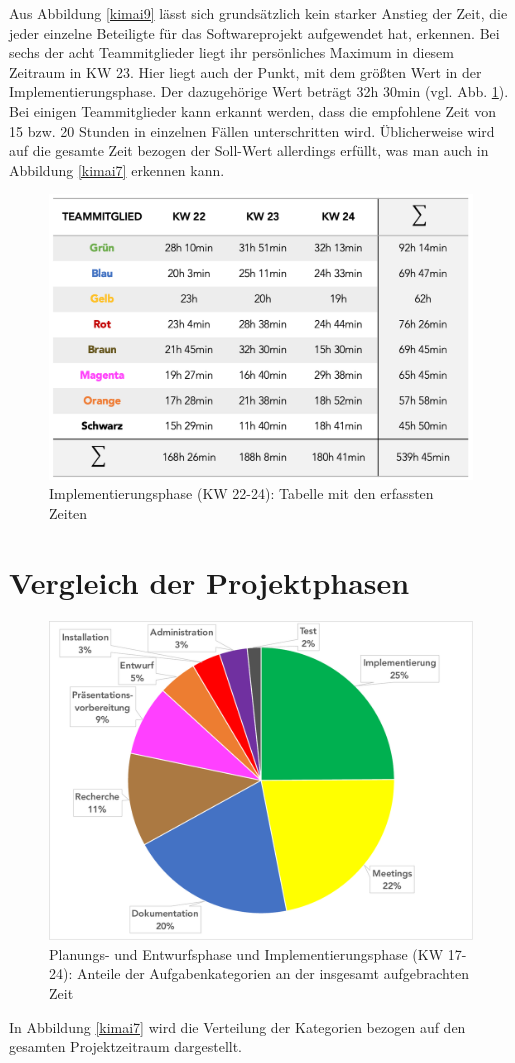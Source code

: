 \documentclass[../review_2.tex]{subfiles}
\begin{document}
Aus Abbildung \ref{kimai9} lässt sich grundsätzlich kein starker Anstieg der Zeit, die jeder einzelne Beteiligte für das Softwareprojekt aufgewendet hat, erkennen. Bei sechs der acht Teammitglieder liegt ihr persönliches Maximum in diesem Zeitraum in KW 23. Hier liegt auch der Punkt, mit dem größten Wert in der Implementierungsphase. Der dazugehörige Wert beträgt 32h 30min (vgl. Abb. \ref{kimai11}).
Bei einigen Teammitglieder kann erkannt werden, dass die empfohlene Zeit von 15 bzw. 20 Stunden in einzelnen Fällen unterschritten wird. Üblicherweise wird auf die gesamte Zeit bezogen der Soll-Wert allerdings erfüllt, was man auch in Abbildung \ref{kimai7} erkennen kann.


\begin{figure} [h]
    \centering
    \includegraphics[width = 0.8\linewidth]{img/kimai11.png}
    \caption{Implementierungsphase (KW 22-24): Tabelle mit den erfassten Zeiten}
    \label{kimai11}
\end{figure} 

\section{Vergleich der Projektphasen}
\begin{figure} [h]
    \centering
    \includegraphics[width = 0.8\linewidth]{img/kimai6.pdf}
    \caption{Planungs- und Entwurfsphase und Implementierungsphase (KW 17-24): Anteile der Aufgabenkategorien an der insgesamt aufgebrachten Zeit}
    \label{kimai6}
\end{figure} 
In Abbildung \ref{kimai7} wird die Verteilung der Kategorien bezogen auf den gesamten Projektzeitraum dargestellt.
\end{document}
